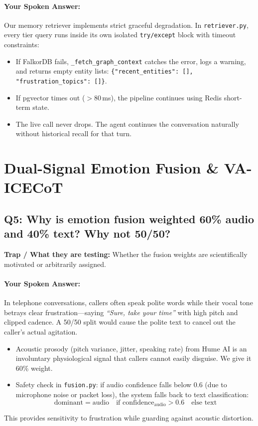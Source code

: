 \documentclass[11pt,a4paper]{article}
\begin{document}
\paragraph{Your Spoken Answer:}
Our memory retriever implements strict graceful degradation. In \texttt{retriever.py}, every tier query runs inside its own isolated \texttt{try/except} block with timeout constraints:
\begin{itemize}
    \item If FalkorDB fails, \texttt{\_fetch\_graph\_context} catches the error, logs a warning, and returns empty entity lists: \texttt{\{"recent\_entities": [], "frustration\_topics": []\}}.
    \item If pgvector times out ($>80$\,ms), the pipeline continues using Redis short-term state.
    \item The live call never drops. The agent continues the conversation naturally without historical recall for that turn.
\end{itemize}

\newpage

\section{Dual-Signal Emotion Fusion \& VA-ICECoT}

\subsection*{Q5: Why is emotion fusion weighted 60\% audio and 40\% text? Why not 50/50?}
\textbf{Trap / What they are testing:} Whether the fusion weights are scientifically motivated or arbitrarily assigned.

\paragraph{Your Spoken Answer:}
In telephone conversations, callers often speak polite words while their vocal tone betrays clear frustration—saying \textit{``Sure, take your time''} with high pitch and clipped cadence. A 50/50 split would cause the polite text to cancel out the caller's actual agitation.
\begin{itemize}
    \item Acoustic prosody (pitch variance, jitter, speaking rate) from Hume AI is an involuntary physiological signal that callers cannot easily disguise. We give it 60\% weight.
    \item Safety check in \texttt{fusion.py}: if audio confidence falls below 0.6 (due to microphone noise or packet loss), the system falls back to text classification:
    \[
    \text{dominant} = \text{audio} \quad \text{if } \text{confidence}_{\text{audio}} > 0.6 \quad \text{else } \text{text}
    \]
\end{itemize}
This provides sensitivity to frustration while guarding against acoustic distortion.
\end{document}
